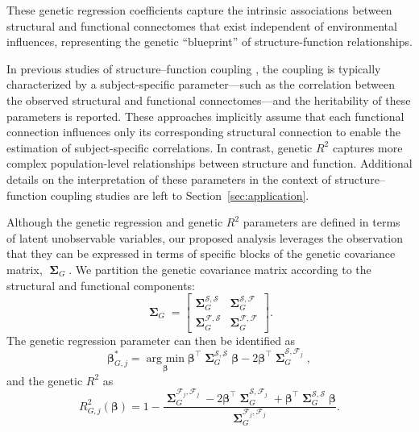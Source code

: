 \documentclass[12pt]{article}
\newcommand{\argmin}{\operatorname*{arg \ min}}
\DeclareMathOperator{\bSigma}{\mathbf{\Sigma}}
\begin{document}
These genetic regression coefficients capture the intrinsic associations between structural and functional connectomes that exist independent of environmental influences, representing the genetic ``blueprint'' of structure-function relationships.

In previous studies of structure–function coupling \parencite{gu2021heritability}, the coupling is typically characterized by a subject-specific parameter—such as the correlation between the observed structural and functional connectomes—and the heritability of these parameters is reported. These approaches implicitly assume that each functional connection influences only its corresponding structural connection to enable the estimation of subject-specific correlations. In contrast, genetic $R^2$ captures more complex population-level relationships between structure and function. Additional details on the interpretation of these parameters in the context of structure–function coupling studies are left to Section~\ref{sec:application}.

Although the genetic regression and genetic $R^2$ parameters are defined in terms of latent unobservable variables, our proposed analysis leverages the observation that they can be expressed in terms of specific blocks of the genetic covariance matrix, $\bSigma_G$. We partition the genetic covariance matrix according to the structural and functional components:
$$
\bSigma_G = 
\begin{bmatrix}
\bSigma_G^{\mathcal{S},\mathcal{S}} & \bSigma_G^{\mathcal{S},\mathcal{F}} \\
\bSigma_G^{\mathcal{F},\mathcal{S}} & \bSigma_G^{\mathcal{F},\mathcal{F}}
\end{bmatrix}. 
$$
The genetic regression parameter can then be identified as
\begin{equation}\label{eq:geneticbeta_cov}
\boldsymbol{\beta}_{G, j}^*  = 
\argmin_{\boldsymbol{\beta}} \boldsymbol{\beta}^\top \bSigma_G^{\mathcal{S}, \mathcal{S}} \boldsymbol{\beta} - 2\boldsymbol{\beta}^\top \bSigma_G^{\mathcal{S},\mathcal{F}_j},
\end{equation}
and the genetic $R^2$ as
\begin{equation}\label{eq:geneticr2_cov}
R^2_{G, j}(\boldsymbol{\beta}) = 1 - \frac{\bSigma_G^{\mathcal{F}_j,\mathcal{F}_j} - 2 \boldsymbol \beta^\top \bSigma_G^{\mathcal{S}, \mathcal{F}_j} + \boldsymbol \beta^\top \bSigma_G^{\mathcal{S}, \mathcal{S}} \boldsymbol \beta }{\bSigma_G^{\mathcal{F}_j, \mathcal{F}_j}}.
\end{equation}
\end{document}
